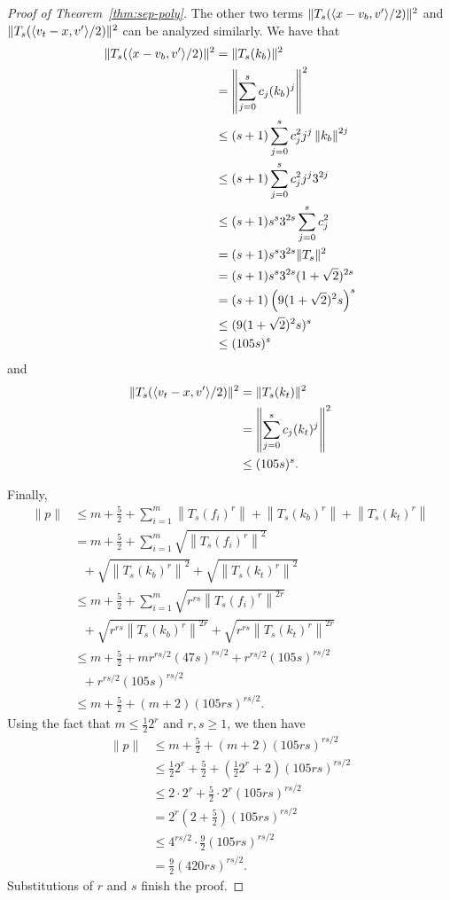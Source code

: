 \begin{proof}[Proof of Theorem~\ref{thm:sep-poly}]
The other two terms $\|T_s(\langle x-v_b,v'\rangle/2)\|^2$ and $\|T_s(\langle v_t-x,v'\rangle/2)\|^2$ can be analyzed similarly.  We have that
\begin{align*}
    \|T_s(\langle x-v_b,v'\rangle/2)\|^2&=\|T_s(k_b)\|^2 \\
    &=\left\|\sum_{j=0}^s c_j(k_b)^j\right\|^2 \\
    &\leq (s+1)\sum_{j=0}^s c_j^2j^j\left\|k_b\right\|^{2j} \\
    &\leq (s+1)\sum_{j=0}^s c_j^2j^j3^{2j} \\
    &\leq (s+1)s^s3^{2s}\sum_{j=0}^s c_j^2 \\
    &=(s+1)s^s3^{2s}\|T_s\|^2 \\
    &=(s+1)s^s3^{2s}(1+\sqrt{2})^{2s} \\
    &=(s+1)\left(9(1+\sqrt{2})^2s\right)^s \\
    &\leq (9(1+\sqrt{2})^2s)^s \\
    &\leq (105s)^s
\end{align*}
and
\begin{align*}
    \|T_s(\langle v_t-x,v'\rangle/2)\|^2 &= \|T_s(k_t)\|^2 \\
    &=\left\|\sum_{j=0}^s c_j(k_t)^j\right\|^2 \\
    &\leq (105s)^s.
\end{align*}

Finally,
\begin{align*}
    \|p\|&\leq m+\frac{5}{2}+\sum_{i=1}^m\left\|T_s(f_i)^r\right\|
    +\left\|T_s(k_b)^r\right\|+\left\|T_s(k_t)^r\right\| \\
    &=m+\frac{5}{2}+\sum_{i=1}^m\sqrt{\left\|T_s(f_i)^r\right\|^2} \\
    &\ \ \ +\sqrt{\left\|T_s(k_b)^r\right\|^2} +\sqrt{\left\|T_s(k_t)^r\right\|^2} \\
    &\leq m+\frac{5}{2}+\sum_{i=1}^m\sqrt{r^{rs}\left\|T_s(f_i)^r\right\|^{2r}} \\
    &\ \ \ +\sqrt{r^{rs}\left\|T_s(k_b)^r\right\|^{2r}}+\sqrt{r^{rs}\left\|T_s(k_t)^r\right\|^{2r}} \\
    &\leq m+\frac{5}{2}+m r^{rs/2}(47s)^{rs/2}+r^{rs/2}(105s)^{rs/2} \\ 
    &\ \ \ +r^{rs/2}(105s)^{rs/2} \\
    &\leq m+\frac{5}{2}+(m+2)(105rs)^{rs/2}.
\end{align*}
Using the fact that $m\leq\frac{1}{2}2^r$ and $r,s \geq 1$, we then have
\begin{align*}
    \|p\| &\leq m+\frac{5}{2}+(m+2)(105rs)^{rs/2} \\
        &\leq \frac{1}{2}2^r+\frac{5}{2}+\left( \frac{1}{2}2^r +2\right)(105rs)^{rs/2} \\
        &\leq 2\cdot2^r+\frac{5}{2}\cdot 2^r(105rs)^{rs/2} \\
        &= 2^r\left( 2+\frac{5}{2}\right)(105rs)^{rs/2} \\
        &\leq 4^{rs/2}\cdot\frac{9}{2}(105rs)^{rs/2} \\
        &=\frac{9}{2}(420rs)^{rs/2}.
\end{align*}
Substitutions of $r$ and $s$ finish the proof.
\end{proof}

